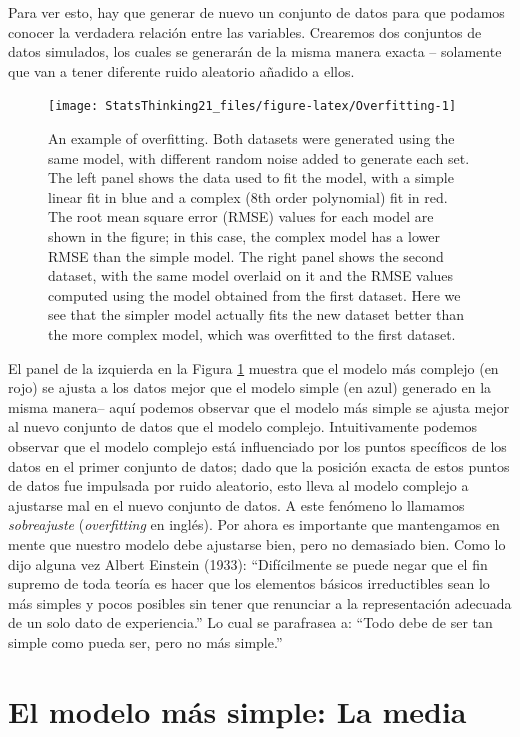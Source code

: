 \documentclass[
  12pt,
]{book}
\begin{document}
Para ver esto, hay que generar de nuevo un conjunto de datos para que podamos conocer la verdadera relación entre las variables. Crearemos dos conjuntos de datos simulados, los cuales se generarán de la misma manera exacta -- solamente que van a tener diferente ruido aleatorio añadido a ellos.

\begin{figure}
\texttt{[image: StatsThinking21\_files/figure-latex/Overfitting-1]} \caption{An example of overfitting. Both datasets were generated using the same model, with different random noise added to generate each set.  The left panel shows the data used to fit the model, with a simple linear fit in blue and a complex (8th order polynomial) fit in red.  The root mean square error (RMSE) values for each model are shown in the figure; in this case, the complex model has a lower RMSE than the simple model.  The right panel shows the second dataset, with the same model overlaid on it and the RMSE values computed using the model obtained from the first dataset.  Here we see that the simpler model actually fits the new dataset better than the more complex model, which was overfitted to the first dataset.}\label{fig:Overfitting}
\end{figure}

El panel de la izquierda en la Figura \ref{fig:Overfitting} muestra que el modelo más complejo (en rojo) se ajusta a los datos mejor que el modelo simple (en azul) generado en la misma manera-- aquí podemos observar que el modelo más simple se ajusta mejor al nuevo conjunto de datos que el modelo complejo. Intuitivamente podemos observar que el modelo complejo está influenciado por los puntos specíficos de los datos en el primer conjunto de datos; dado que la posición exacta de estos puntos de datos fue impulsada por ruido aleatorio, esto lleva al modelo complejo a ajustarse mal en el nuevo conjunto de datos. A este fenómeno lo llamamos \emph{sobreajuste} (\emph{overfitting} en inglés). Por ahora es importante que mantengamos en mente que nuestro modelo debe ajustarse bien, pero no demasiado bien. Como lo dijo alguna vez Albert Einstein (1933): ``Difícilmente se puede negar que el fin supremo de toda teoría es hacer que los elementos básicos irreductibles sean lo más simples y pocos posibles sin tener que renunciar a la representación adecuada de un solo dato de experiencia.'' Lo cual se parafrasea a: ``Todo debe de ser tan simple como pueda ser, pero no más simple.''

\hypertarget{el-modelo-muxe1s-simple-la-media}{%
\section{El modelo más simple: La media}\label{el-modelo-muxe1s-simple-la-media}}
\end{document}
